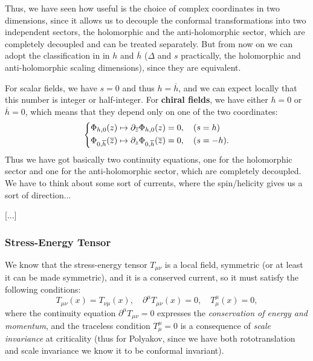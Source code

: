 Thus, we have seen how useful is the choice of complex coordinates in two dimensions, since it allows us to decouple the conformal transformations into two independent sectors, the holomorphic and the anti-holomorphic sector, which are completely decoupled and can be treated separately. But from now on we can adopt the classification in in \(h\) and \(\overline{h}\) (\(\Delta\) and \(s\) practically, the holomorphic and anti-holomorphic scaling dimensions), since they are equivalent.

For scalar fields, we have \(s=0\) and thus \(h = \overline{h}\), and we can expect locally that this number is integer or half-integer. For \textbf{chiral fields}, we have either \(h=0\) or \(\overline{h}=0\), which means that they depend only on one of the two coordinates:
\[
    \begin{dcases}
        \Phi_{h,0}(z) \mapsto \partial_{\overline{z}} \Phi_{h,0}(z) = 0, \quad (s=h) \\
        \Phi_{0,\overline{h}}(\overline{z}) \mapsto \partial_z \Phi_{0,\overline{h}}(\overline{z}) = 0, \quad (s=-h).
    \end{dcases}
\]
Thus we have got basically two continuity equations, one for the holomorphic sector and one for the anti-holomorphic sector, which are completely decoupled. We have to think about some sort of currents, where the spin/helicity gives us a sort of direction...

    [...]

\subsubsection{Stress-Energy Tensor}
We know that the stress-energy tensor \(T_{\mu\nu}\) is a local field, symmetric (or at least it can be made symmetric), and it is a conserved current, so it must satisfy the following conditions:
\[
    T_{\mu\nu}(x) = T_{\nu\mu}(x), \quad \partial^\mu T_{\mu\nu}(x) = 0, \quad T^\mu_\mu(x) = 0,
\]
where the continuity equation \(\partial^\mu T_{\mu\nu} = 0\) expresses the \textit{conservation of energy and momentum}, and the traceless condition \(T^\mu_\mu = 0\) is a consequence of \textit{scale invariance} at criticality (thus for Polyakov, since we have both rototranslation and scale invariance we know it to be conformal invariant).


